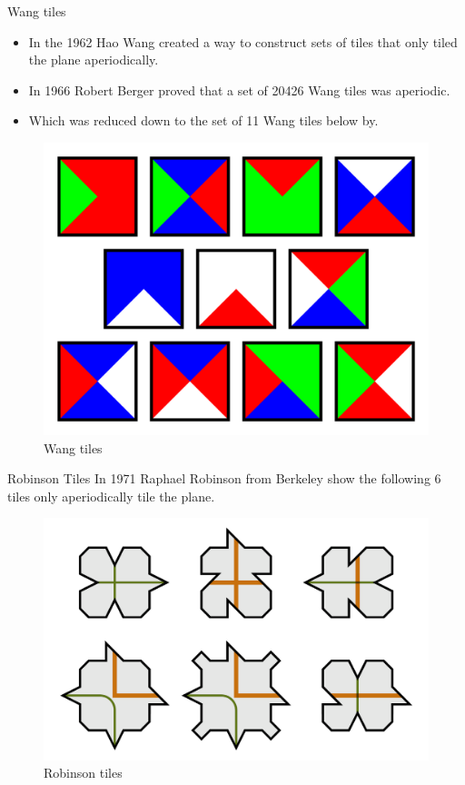 \documentclass{beamer}
\begin{document}
\begin{frame}{Wang tiles}
    \begin{itemize}
        \item In the 1962 Hao Wang created a way to construct sets of tiles that only tiled the plane aperiodically.
        \item In 1966 Robert Berger proved that a set of 20426 Wang tiles was aperiodic. \cite{berger1966undecidability}
        \item Which was reduced down to the set of 11 Wang tiles below by\cite{Jeandel2021aperiodic}.
    \end{itemize}
    
    \begin{figure}
        \centering
        \includegraphics[width=0.4\linewidth]{images/other-tiles/Wang_11_tiles.svg.png}
        \caption{Wang tiles\cite{wang11tiles}}
        \label{fig:wang-tiles}
    \end{figure}
\end{frame}

\begin{frame}{Robinson Tiles}
    In 1971 Raphael Robinson from Berkeley show the following 6 tiles only aperiodically tile the plane.\cite{robinson1971}
    \begin{figure}
        \centering
        \includegraphics[width=0.5\linewidth]{images/other-tiles/Robinson_tiles.svg.png}
        \caption{Robinson tiles\cite{robinsontiles}}
        \label{fig:robinson-tile}
    \end{figure}
\end{frame}
\end{document}
